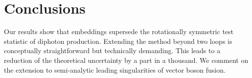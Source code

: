 \section{Conclusions}\label{sec:conclusions}

Our results show that embeddings supersede the rotationally symmetric
test statistic of diphoton production. Extending the method beyond two
loops is conceptually straightforward but technically demanding. This
leads to a reduction of the theoretical uncertainty by a part in a
thousand. We comment on the extension to semi-analytic leading
singularities of vector boson fusion.

